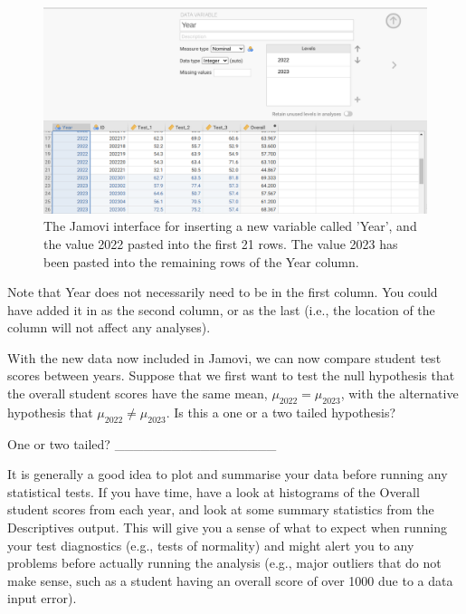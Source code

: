 \documentclass[
]{scrbook}
\begin{document}
\begin{figure}
\includegraphics[width=1\linewidth]{img/jamovi_insert_year} \caption{The Jamovi interface for inserting a new variable called 'Year', and the value 2022 pasted into the first 21 rows. The value 2023 has been pasted into the remaining rows of the Year column.}\label{fig:unnamed-chunk-103}
\end{figure}

Note that Year does not necessarily need to be in the first column.
You could have added it in as the second column, or as the last (i.e., the location of the column will not affect any analyses).

With the new data now included in Jamovi, we can now compare student test scores between years.
Suppose that we first want to test the null hypothesis that the overall student scores have the same mean, \(\mu_{2022} = \mu_{2023}\), with the alternative hypothesis that \(\mu_{2022} \neq \mu_{2023}\).
Is this a one or a two tailed hypothesis?

One or two tailed? \_\_\_\_\_\_\_\_\_\_\_\_\_\_\_\_\_

It is generally a good idea to plot and summarise your data before running any statistical tests.
If you have time, have a look at histograms of the Overall student scores from each year, and look at some summary statistics from the Descriptives output.
This will give you a sense of what to expect when running your test diagnostics (e.g., tests of normality) and might alert you to any problems before actually running the analysis (e.g., major outliers that do not make sense, such as a student having an overall score of over 1000 due to a data input error).
\end{document}

